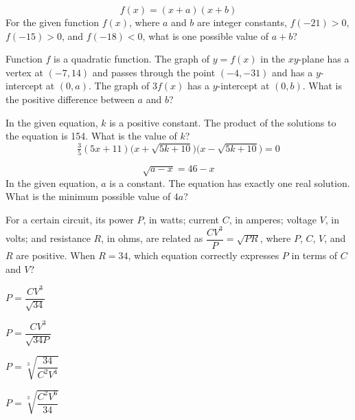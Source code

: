 \vfill
\clearpage
\noindent\begin{minipage}{\linewidth}
\par\smallskip
$$f(x)=(x+a)(x+b)$$ For the given function $f(x)$, where $a$ and $b$ are integer constants, $f(-21)>0$, $f(-15)>0$, and $f(-18)<0$, what is one possible value of $a+b$?
\end{minipage}
\vfill
\noindent\begin{minipage}{\linewidth}
\par\smallskip
Function $f$ is a quadratic function. The graph of $y=f(x)$ in the $xy$-plane has a vertex at $(-7,14)$ and passes through the point $(-4,-31)$ and has a $y$-intercept at $(0,a)$. The graph of $3f(x)$ has a $y$-intercept at $(0,b)$. What is the positive difference between $a$ and $b$?
\end{minipage}
\vfill
\noindent\begin{minipage}{\linewidth}
\par\smallskip
In the given equation, $k$ is a positive constant. The product of the solutions to the equation is 154. What is the value of $k$? $$\tfrac{3}{5}(5x+11)\bigl(x+\sqrt{5k+10}\bigr)\bigl(x-\sqrt{5k+10}\bigr)=0$$
\end{minipage}
\vfill
\clearpage
\noindent\begin{minipage}{\linewidth}
\par\smallskip
$$\sqrt{a-x}=46-x$$ In the given equation, $a$ is a constant. The equation has exactly one real solution. What is the minimum possible value of $4a$?
\end{minipage}
\vfill
\noindent\begin{minipage}{\linewidth}
\par\smallskip
For a certain circuit, its power $P$, in watts; current $C$, in amperes; voltage $V$, in volts; and resistance $R$, in ohms, are related as $\dfrac{CV^3}{P}=\sqrt{PR}$, where $P$, $C$, $V$, and $R$ are positive. When $R=34$, which equation correctly expresses $P$ in terms of $C$ and $V$?
\begin{satchoices}
  \item[A)] $P=\dfrac{CV^3}{\sqrt{34}}$
  \item[B)] $P=\dfrac{CV^3}{\sqrt{34P}}$
  \item[C)] $P=\sqrt[3]{\dfrac{34}{C^2V^4}}$
  \item[D)] $P=\sqrt[3]{\dfrac{C^2V^6}{34}}$
\end{satchoices}
\end{minipage}
